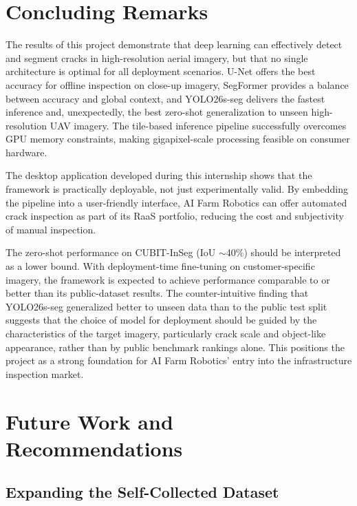 \section{Concluding Remarks}
\label{sec:concluding_remarks}

\hs The results of this project demonstrate that deep learning can effectively detect and segment cracks in high-resolution aerial imagery, but that no single architecture is optimal for all deployment scenarios. U-Net offers the best accuracy for offline inspection on close-up imagery, SegFormer provides a balance between accuracy and global context, and YOLO26s-seg delivers the fastest inference and, unexpectedly, the best zero-shot generalization to unseen high-resolution UAV imagery. The tile-based inference pipeline successfully overcomes GPU memory constraints, making gigapixel-scale processing feasible on consumer hardware.

\hs The desktop application developed during this internship shows that the framework is practically deployable, not just experimentally valid. By embedding the pipeline into a user-friendly interface, AI Farm Robotics can offer automated crack inspection as part of its RaaS portfolio, reducing the cost and subjectivity of manual inspection.

\hs The zero-shot performance on CUBIT-InSeg (IoU $\sim$40\%) should be interpreted as a lower bound. With deployment-time fine-tuning on customer-specific imagery, the framework is expected to achieve performance comparable to or better than its public-dataset results. The counter-intuitive finding that YOLO26s-seg generalized better to unseen data than to the public test split suggests that the choice of model for deployment should be guided by the characteristics of the target imagery, particularly crack scale and object-like appearance, rather than by public benchmark rankings alone. This positions the project as a strong foundation for AI Farm Robotics' entry into the infrastructure inspection market.

\section{Future Work and Recommendations}
\label{sec:future_work}

\subsection{Expanding the Self-Collected Dataset}

